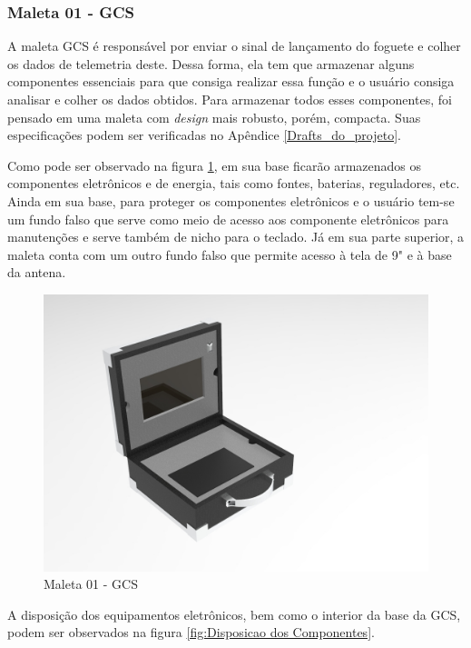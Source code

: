 \subsubsection{Maleta 01 - GCS}
\label{maleta_01}
A maleta GCS é responsável por enviar o sinal de lançamento do foguete e colher os dados de telemetria deste. Dessa forma, ela tem que armazenar alguns componentes essenciais para que consiga realizar essa função e o usuário consiga analisar e colher os dados obtidos. Para armazenar todos esses componentes, foi pensado em uma maleta com \textit{design} mais robusto, porém, compacta. Suas especificações podem ser verificadas no Apêndice \ref{Drafts_do_projeto}.
\par Como pode ser observado na figura \ref{fig:Render Maleta GCS}, em sua base ficarão armazenados os componentes eletrônicos e de energia, tais como fontes, baterias, reguladores, etc. Ainda em sua base, para proteger os componentes eletrônicos e o usuário tem-se um fundo falso que serve como meio de acesso aos componente eletrônicos para manutenções e serve também de nicho para o teclado. Já em sua parte superior, a maleta conta com um outro fundo falso que permite acesso à tela de 9" e à base da antena.

\begin{figure}[H]
    \centering
        \includegraphics[width=\linewidth]{figuras/Render Maleta GCS.jpg}
    \caption{\label{fig:Render Maleta GCS} Maleta 01 - GCS}
\end{figure}

\par A disposição dos equipamentos eletrônicos, bem como o interior da base da GCS, podem ser observados na figura \ref{fig:Disposicao dos Componentes}.

